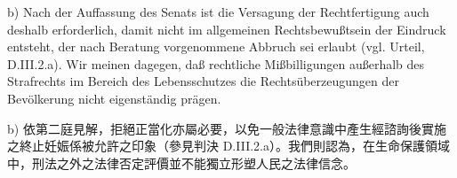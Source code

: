 \documentclass[12pt]{article}
\begin{document}
\begin{sourcepara}[title={原文SondervotumMS.302}]
b) Nach der Auffassung des Senats ist die Versagung der Rechtfertigung auch deshalb erforderlich, damit nicht im allgemeinen Rechtsbewußtsein der Eindruck entsteht, der nach Beratung vorgenommene Abbruch sei erlaubt (vgl. Urteil, D.III.2.a). Wir meinen dagegen, daß rechtliche Mißbilligungen außerhalb des Strafrechts im Bereich des Lebensschutzes die Rechtsüberzeugungen der Bevölkerung nicht eigenständig prägen.
\end{sourcepara}
\begin{transpara}
b) 依第二庭見解，拒絕正當化亦屬必要，以免一般法律意識中產生經諮詢後實施之終止妊娠係被允許之印象（參見判決 D.III.2.a）。我們則認為，在生命保護領域中，刑法之外之法律否定評價並不能獨立形塑人民之法律信念。
\end{transpara}
\end{document}
